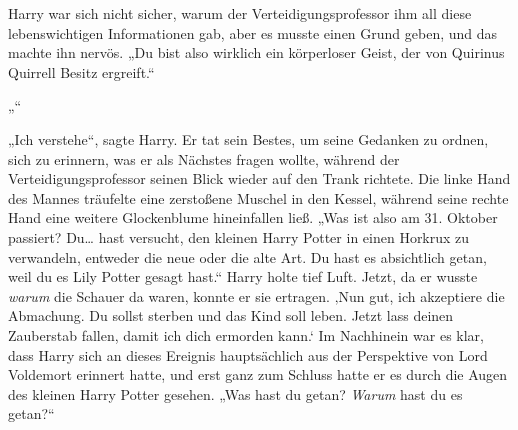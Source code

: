 Harry war sich nicht sicher, warum der Verteidigungsprofessor ihm all diese lebenswichtigen Informationen gab, aber es musste einen Grund geben, und das machte ihn nervös.
„Du bist also wirklich ein körperloser Geist, der von Quirinus Quirrell Besitz ergreift.“

„“

„Ich verstehe“, sagte Harry.
Er tat sein Bestes, um seine Gedanken zu ordnen, sich zu erinnern, was er als Nächstes fragen wollte, während der Verteidigungsprofessor seinen Blick wieder auf den Trank richtete. Die linke Hand des Mannes träufelte eine zerstoßene Muschel in den Kessel, während seine rechte Hand eine weitere Glockenblume hineinfallen ließ.
„Was ist also am 31. Oktober passiert? Du… hast versucht, den kleinen Harry Potter in einen Horkrux zu verwandeln, entweder die neue oder die alte Art. Du hast es absichtlich getan, weil du es Lily Potter gesagt hast.“
Harry holte tief Luft. Jetzt, da er wusste \emph{warum} die Schauer da waren, konnte er sie ertragen.
‚Nun gut, ich akzeptiere die Abmachung. Du sollst sterben und das Kind soll leben. Jetzt lass deinen Zauberstab fallen, damit ich dich ermorden kann.‘
Im Nachhinein war es klar, dass Harry sich an dieses Ereignis hauptsächlich aus der Perspektive von Lord Voldemort erinnert hatte, und erst ganz zum Schluss hatte er es durch die Augen des kleinen Harry Potter gesehen.
„Was hast du getan? \emph{Warum} hast du es getan?“

